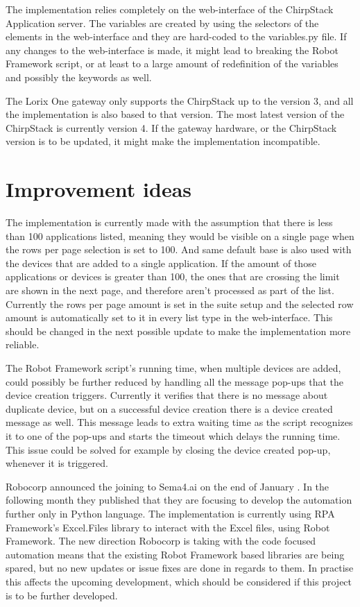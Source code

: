 The implementation relies completely on the web-interface of the ChirpStack Application server.
The variables are created by using the selectors of the elements in the web-interface and they are hard-coded to the variables.py file.
If any changes to the web-interface is made, it might lead to breaking the Robot Framework script, or at least to a large amount of redefinition of the variables and possibly the keywords as well.

The Lorix One gateway only supports the ChirpStack up to the version 3, and all the implementation is also based to that version.
The most latest version of the ChirpStack is currently version 4.
If the gateway hardware, or the ChirpStack version is to be updated, it might make the implementation incompatible.

\section{Improvement ideas}

The implementation is currently made with the assumption that there is less than 100 applications listed, meaning they would be visible on a single page when the rows per page selection is set to 100.
And same default base is also used with the devices that are added to a single application.
If the amount of those applications or devices is greater than 100, the ones that are crossing the limit are shown in the next page,  and therefore aren't processed as part of the list.
Currently the rows per page amount is set in the suite setup and the selected row amount is automatically set to it in every list type in the web-interface.
This should be changed in the next possible update to make the implementation more reliable.

The Robot Framework script's running time, when multiple devices are added, could possibly be further reduced by handling all the message pop-ups that the device creation triggers.
Currently it verifies that there is no message about duplicate device, but on a successful device creation there is a device created message as well. 
This message leads to extra waiting time as the script recognizes it to one of the pop-ups and starts the timeout which delays the running time.
This issue could be solved for example by closing the device created pop-up, whenever it is triggered.

Robocorp announced the joining to Sema4.ai on the end of January \cite{robocorp:sema4.ai}.
In the following month they published that they are focusing to develop the automation further only in Python language.
The implementation is currently using RPA Framework's Excel.Files library to interact with the Excel files, using Robot Framework.
The new direction Robocorp is taking with the code focused automation means that the existing Robot Framework based libraries are being spared, but no new updates or issue fixes are done in regards to them.
In practise this affects the upcoming development, which should be considered if this project is to be further developed.


